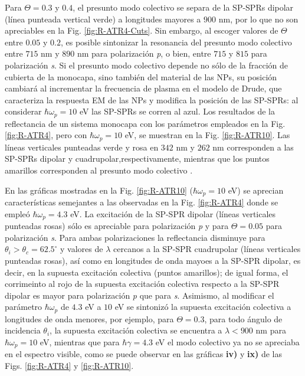 Para $\Theta = 0.3$ y $0.4$, el presunto modo colectivo se separa de la SP-SPRs dipolar (línea punteada vertical verde) a longitudes mayores a $900$ nm, por lo que 
no son apreciables en la Fig. \ref{fig:R-ATR4-Cuts}. Sin embargo, al escoger valores de $\Theta$ entre $0.05$ y $0.2$, es posible sintonizar la resonancia del presunto modo colectivo entre $715$ nm y $890$ nm para polarización \emph{p}, o bien, entre $715$ y $815$ para polarización \emph{s}. Si el presunto modo colectivo depende no sólo de la fracción de cubierta de la monocapa, sino también del material de las NPs, su posición cambiará al incrementar la frecuencia de plasma en el modelo de Drude, que caracteriza la respuesta EM de las NPs y modifica la posición de las SP-SPRs: al considerar $\hbar\omega_p = 10$ eV las SP-SPRs se corren al azul. Los resultados de la reflectancia de un sistema monocapa con los parámetros empleados en la Fig. \ref{fig:R-ATR4}, pero con $\hbar\omega_p = 10$ eV, se muestran en la Fig. \ref{fig:R-ATR10}. Las líneas verticales punteadas verde y rosa en $342$ nm y $262$ nm corresponden a las SP-SPRs dipolar y cuadrupolar,respectivamente, mientras que los puntos amarillos corresponden al presunto modo colectivo .
				
	
En las gráficas mostradas en la Fig. \ref{fig:R-ATR10} ($\hbar\omega_p = 10$ eV) se aprecian características semejantes a las observadas en la Fig. \ref{fig:R-ATR4} donde se empleó $\hbar\omega_p = 4.3$ eV. La excitación de la SP-SPR dipolar (líneas verticales punteadas rosas) sólo es apreciable para polarización \emph{p} y para $\Theta = 0.05$ para polarización  \emph{s}. Para ambas polarizaciones la reflectancia disminuye para $\theta_i>\theta_c=62.5^\circ$ y valores de $\lambda$ cercanos a la SP-SPR cuadrupolar (líneas verticales punteadas rosas), así como en longitudes de onda mayoes a la SP-SPR dipolar, es decir, en la supuesta excitación colectiva  (puntos amarillos); de igual forma, el corrimeinto al rojo de la supuesta excitación colectiva respecto a la SP-SPR dipolar es mayor para polarización \emph{p} que para \emph{s}.  Asimismo, al modificar el parámetro $\hbar\omega_p$ de $4.3$ eV a $10$ eV se sintonizó la supuesta excitación colectiva a longitudes de onda menores, por ejemplo, para $\Theta = 0.3$, para todo ángulo de incidencia $\theta_i$, la supuesta excitación colectiva se encuentra a $\lambda<900$ nm para $\hbar\omega_p=10$ eV, mientras que para $\hbar\gamma=4.3$ eV el modo colectivo ya no se apreciaba en el espectro visible, como se puede observar en las gráficas \textbf{iv)} y \textbf{ix)} de las Figs. \ref{fig:R-ATR4} y \ref{fig:R-ATR10}.

